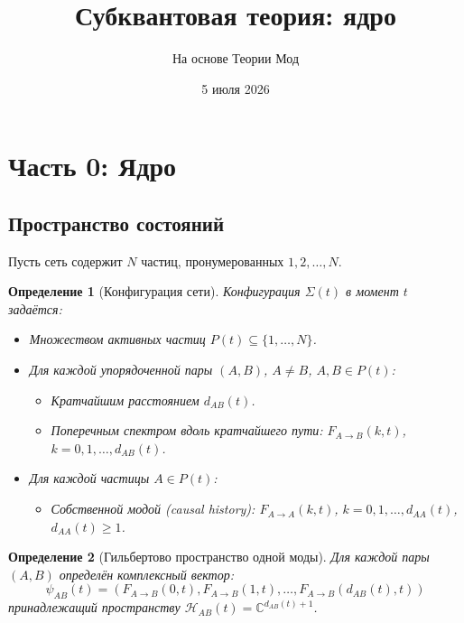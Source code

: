 \documentclass[11pt,a4paper]{article}
\title{Субквантовая теория: ядро}
\author{На основе Теории Мод}
\date{5 июля 2026}
\newtheorem{definition}{Определение}[section]
\theoremstyle{definition}
\begin{document}
\maketitle
\tableofcontents
\newpage

\section{Часть 0: Ядро}

\subsection{Пространство состояний}

Пусть сеть содержит $N$ частиц, пронумерованных $1, 2, \dots, N$.

\begin{definition}[Конфигурация сети]
Конфигурация $\Sigma(t)$ в момент $t$ задаётся:
\begin{itemize}
    \item Множеством активных частиц $P(t) \subseteq \{1, \dots, N\}$.
    \item Для каждой упорядоченной пары $(A, B)$, $A \neq B$, $A, B \in P(t)$:
    \begin{itemize}
        \item Кратчайшим расстоянием $d_{AB}(t)$.
        \item Поперечным спектром вдоль кратчайшего пути: $F_{A \to B}(k, t)$, $k = 0, 1, \dots, d_{AB}(t)$.
    \end{itemize}
    \item Для каждой частицы $A \in P(t)$:
    \begin{itemize}
        \item Собственной модой (causal history): $F_{A \to A}(k, t)$, $k = 0, 1, \dots, d_{AA}(t)$, $d_{AA}(t) \geq 1$.
    \end{itemize}
\end{itemize}
\end{definition}

\begin{definition}[Гильбертово пространство одной моды]
Для каждой пары $(A, B)$ определён комплексный вектор:
\begin{equation}
    \psi_{AB}(t) = (F_{A \to B}(0, t), F_{A \to B}(1, t), \dots, F_{A \to B}(d_{AB}(t), t))
\end{equation}
принадлежащий пространству $\mathcal{H}_{AB}(t) = \mathbb{C}^{d_{AB}(t)+1}$.
\end{definition}
\end{document}
